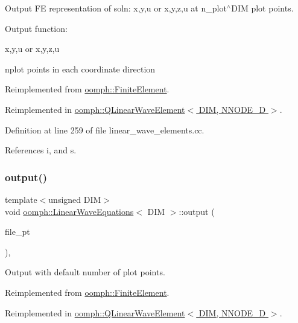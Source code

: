 Output FE representation of soln\+: x,y,u or x,y,z,u at n\+\_\+plot$^\wedge$\+D\+IM plot points. 

Output function\+:

x,y,u or x,y,z,u

nplot points in each coordinate direction 

Reimplemented from \hyperlink{classoomph_1_1FiniteElement_afa9d9b2670f999b43e6679c9dd28c457}{oomph\+::\+Finite\+Element}.



Reimplemented in \hyperlink{classoomph_1_1QLinearWaveElement_a4e44576ef363b7b9680a60da96b7687b}{oomph\+::\+Q\+Linear\+Wave\+Element$<$ D\+I\+M, N\+N\+O\+D\+E\+\_\+D $>$}.



Definition at line 259 of file linear\+\_\+wave\+\_\+elements.\+cc.



References i, and s.

\mbox{\label{classoomph_1_1LinearWaveEquations_a7a1464dbadf5fb3542979951b389694b}} 
\subsubsection{\texorpdfstring{output()}{output()}\hspace{0.1cm}{\footnotesize\ttfamily [3/4]}}
{\footnotesize\ttfamily template$<$unsigned D\+IM$>$ \\
void \hyperlink{classoomph_1_1LinearWaveEquations}{oomph\+::\+Linear\+Wave\+Equations}$<$ D\+IM $>$\+::output (\begin{DoxyParamCaption}\item[{F\+I\+LE $\ast$}]{file\+\_\+pt }\end{DoxyParamCaption})\hspace{0.3cm}{\ttfamily [inline]}, {\ttfamily [virtual]}}



Output with default number of plot points. 



Reimplemented from \hyperlink{classoomph_1_1FiniteElement_a72cddd09f8ddbee1a20a1ff404c6943e}{oomph\+::\+Finite\+Element}.



Reimplemented in \hyperlink{classoomph_1_1QLinearWaveElement_a9b6c23f23a7f8e188241fe2698c7543d}{oomph\+::\+Q\+Linear\+Wave\+Element$<$ D\+I\+M, N\+N\+O\+D\+E\+\_\+D $>$}.



